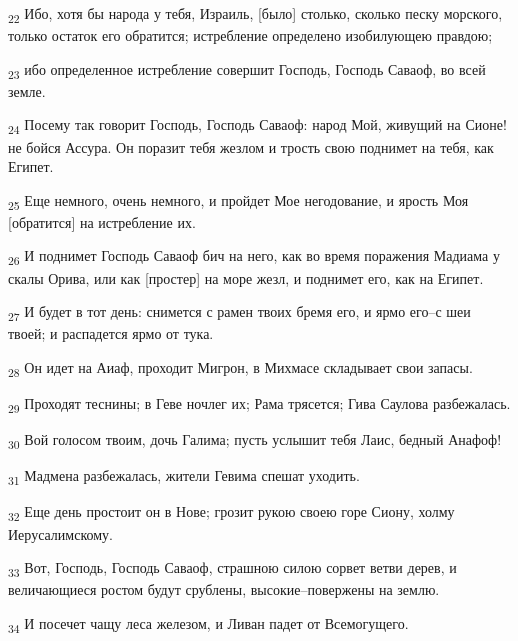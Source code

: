 \begin{tcolorbox}
\textsubscript{22} Ибо, хотя бы народа у тебя, Израиль, [было] столько, сколько песку морского, только остаток его обратится; истребление определено изобилующею правдою;
\end{tcolorbox}
\begin{tcolorbox}
\textsubscript{23} ибо определенное истребление совершит Господь, Господь Саваоф, во всей земле.
\end{tcolorbox}
\begin{tcolorbox}
\textsubscript{24} Посему так говорит Господь, Господь Саваоф: народ Мой, живущий на Сионе! не бойся Ассура. Он поразит тебя жезлом и трость свою поднимет на тебя, как Египет.
\end{tcolorbox}
\begin{tcolorbox}
\textsubscript{25} Еще немного, очень немного, и пройдет Мое негодование, и ярость Моя [обратится] на истребление их.
\end{tcolorbox}
\begin{tcolorbox}
\textsubscript{26} И поднимет Господь Саваоф бич на него, как во время поражения Мадиама у скалы Орива, или как [простер] на море жезл, и поднимет его, как на Египет.
\end{tcolorbox}
\begin{tcolorbox}
\textsubscript{27} И будет в тот день: снимется с рамен твоих бремя его, и ярмо его--с шеи твоей; и распадется ярмо от тука.
\end{tcolorbox}
\begin{tcolorbox}
\textsubscript{28} Он идет на Аиаф, проходит Мигрон, в Михмасе складывает свои запасы.
\end{tcolorbox}
\begin{tcolorbox}
\textsubscript{29} Проходят теснины; в Геве ночлег их; Рама трясется; Гива Саулова разбежалась.
\end{tcolorbox}
\begin{tcolorbox}
\textsubscript{30} Вой голосом твоим, дочь Галима; пусть услышит тебя Лаис, бедный Анафоф!
\end{tcolorbox}
\begin{tcolorbox}
\textsubscript{31} Мадмена разбежалась, жители Гевима спешат уходить.
\end{tcolorbox}
\begin{tcolorbox}
\textsubscript{32} Еще день простоит он в Нове; грозит рукою своею горе Сиону, холму Иерусалимскому.
\end{tcolorbox}
\begin{tcolorbox}
\textsubscript{33} Вот, Господь, Господь Саваоф, страшною силою сорвет ветви дерев, и величающиеся ростом будут срублены, высокие--повержены на землю.
\end{tcolorbox}
\begin{tcolorbox}
\textsubscript{34} И посечет чащу леса железом, и Ливан падет от Всемогущего.
\end{tcolorbox}

